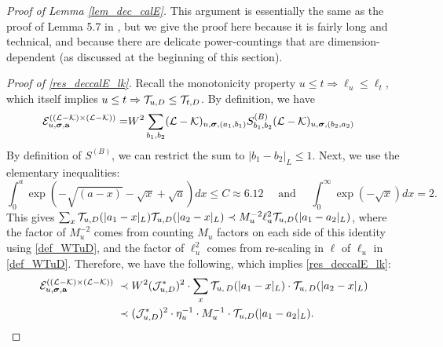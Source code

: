  \begin{proof}[Proof of Lemma \ref{lem_dec_calE}]
 This argument is essentially the same as the proof of Lemma 5.7 in \cite{YY_25}, but we give the proof here because it is fairly long and technical, and because there are delicate power-countings that are dimension-dependent (as discussed at the beginning of this section).
 
 
\emph{Proof of \eqref{res_deccalE_lk}.}  
Recall the monotonicity property $u\leq t\Rightarrow\ell_{u}\leq \ell_{t}$, which itself implies $u\leq t\Rightarrow{\cal T}_{u,D}\leq{\cal T}_{t,D}$. By definition, we have
\begin{align} {\cal E}^{( ({\cal L-K})\times({\cal L-K}) )}_{u,  \boldsymbol{\sigma},  \textbf{a} }
= &W^{2}\sum_{b_1,b_2}({\cal L-K})_{u,
\boldsymbol{\sigma}, 
( a_1, b_1)
}
S^{(B)}_{b_1,b_2}
({\cal L-K})_{u,  \boldsymbol{\sigma},  ( b_2, a_2)}
\end{align}
By definition of $S^{(B)}$,  we can restrict the sum to $|b_1-b_2|_{L}\le 1$. Next, we use the elementary inequalities: 
$$
\int_{0 }^a\exp\left(-\sqrt{(a-x)}-\sqrt x+ \sqrt a\right)dx\le C\approx 6.12
\quad \text{ and } \quad 
\int_{0 }^\infty\exp\left({-\sqrt x}\right)dx=2.
$$
This gives $\sum_{x}{\cal T}_{u,D}(|a_{1}-x|_{L}){\cal T}_{u,D}(|a_{2}-x|_{L})\prec M_{u}^{-2}\ell_{u}^{2}{\cal T}_{u,D}(|a_{1}-a_{2}|_{L})$, where the factor of $M_{u}^{-2}$ comes from counting $M_{u}$ factors on each side of this identity using \eqref{def_WTuD}, and the factor of $\ell_{u}^{2}$ comes from re-scaling in $\ell$ of $\ell_{u}$ in \eqref{def_WTuD}. Therefore, we have the following, which implies \eqref{res_deccalE_lk}:
\begin{align}\nonumber
{\cal E}^{( ({\cal L-K})\times({\cal L-K}) )}_{u,  \boldsymbol{\sigma},  \textbf{a} }
\; \prec \;& W^{2} ({\cal J}_{u,D}^*) ^2\cdot 
\sum_{x }  {\cal T}_{u, \,D}(|a_1-x|_{L}) \cdot {\cal T}_{u, \,D}(|a_2-x|_{L})   
\\\label{mmxiaoxi}
\; \prec \;&
({\cal J}_{u,D}^*) ^2 \cdot 
 \eta_u^{-1}\cdot M_{u}^{-1}\cdot  {\cal T}_{u,D }(|a_1-a_2|_{L}) .
\end{align} 


\end{proof}
